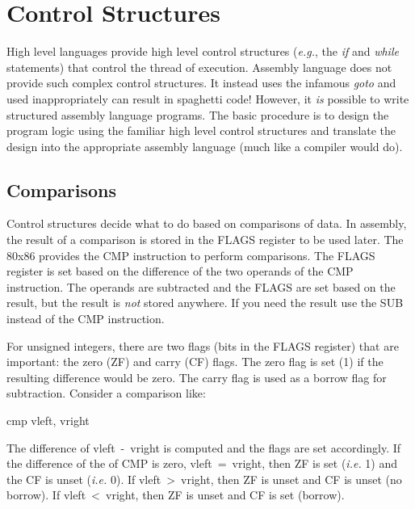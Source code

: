 \section{Control Structures}
\label{sec:control}
High level languages provide high level control structures (\emph{e.g.}, the
\emph{if} and \emph{while} statements) that control the thread of execution.
Assembly language does not provide such complex control structures. It instead
uses the infamous \emph{goto} and used inappropriately can result in
spaghetti code! However, it \emph{is} possible to write structured assembly
language programs. The basic procedure is to design the program logic using
the familiar high level control structures and translate the design into
the appropriate assembly language (much like a compiler would do).

\subsection{Comparisons  }

Control structures decide what to do based on comparisons of data. In
assembly, the result of a comparison is stored in the FLAGS register
to be used later. The 80x86 provides the {\code CMP} instruction to
perform comparisons.  The FLAGS register is set based on the
difference of the two operands of the {\code CMP} instruction. The
operands are subtracted and the FLAGS are set based on the result, but
the result is \emph{not} stored anywhere. If you need the result use
the SUB instead of the {\code CMP} instruction.

For unsigned integers, there are two flags (bits in the FLAGS
register) that are important: the zero (ZF)  and carry (CF) 
 flags. The
zero flag is set (1) if the resulting difference would be zero. The
carry flag is used as a borrow flag for subtraction. Consider a
comparison like:
\begin{AsmCodeListing}[frame=none, numbers=none]
      cmp    vleft, vright
\end{AsmCodeListing}
The difference of {\code vleft~-~vright} is computed and the flags are
set accordingly. If the difference of the of {\code CMP} is zero, {\code 
vleft~=~vright}, then ZF is set (\emph{i.e.} 1) and the CF is unset
(\emph{i.e.} 0). If {\code vleft~>~vright}, then ZF is unset and CF
is unset (no borrow). If {\code vleft~<~vright}, then ZF is unset and
CF is set (borrow).


